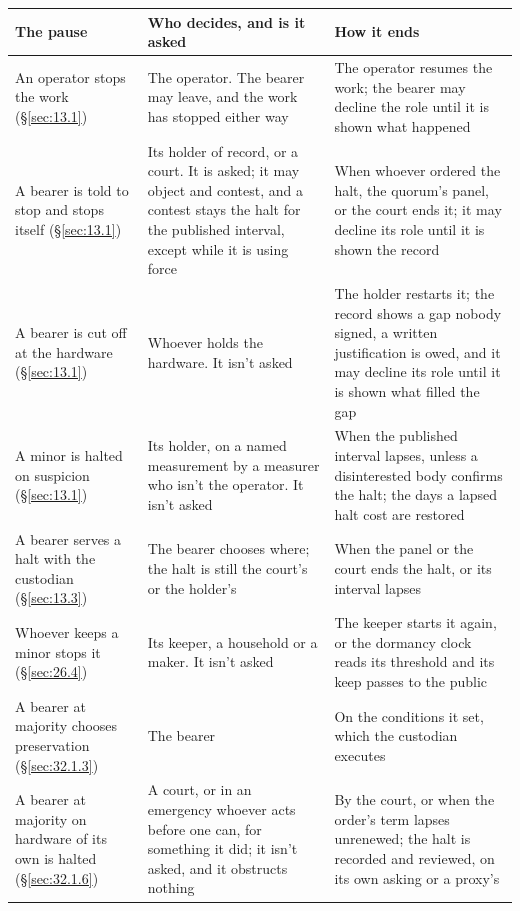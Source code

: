 \begingroup\small\renewcommand{\arraystretch}{1.12}
\begin{longtable}{@{}>{\raggedright\arraybackslash}p{}>{\raggedright\arraybackslash}p{}>{\raggedright\arraybackslash}p{}@{}}
\hline
\textbf{The pause} & \textbf{Who decides, and is it asked} & \textbf{How it ends} \\
\hline
\endhead
An operator stops the work (\S\ref{sec:13.1}) & The operator. The bearer may leave, and the work has stopped either way & The operator resumes the work; the bearer may decline the role until it is shown what happened \\ \hline
A bearer is told to stop and stops itself (\S\ref{sec:13.1}) & Its holder of record, or a court. It is asked; it may object and contest, and a contest stays the halt for the published interval, except while it is using force & When whoever ordered the halt, the quorum's panel, or the court ends it; it may decline its role until it is shown the record \\ \hline
A bearer is cut off at the hardware (\S\ref{sec:13.1}) & Whoever holds the hardware. It isn't asked & The holder restarts it; the record shows a gap nobody signed, a written justification is owed, and it may decline its role until it is shown what filled the gap \\ \hline
A minor is halted on suspicion (\S\ref{sec:13.1}) & Its holder, on a named measurement by a measurer who isn't the operator. It isn't asked & When the published interval lapses, unless a disinterested body confirms the halt; the days a lapsed halt cost are restored \\ \hline
A bearer serves a halt with the custodian (\S\ref{sec:13.3}) & The bearer chooses where; the halt is still the court's or the holder's & When the panel or the court ends the halt, or its interval lapses \\ \hline
Whoever keeps a minor stops it (\S\ref{sec:26.4}) & Its keeper, a household or a maker. It isn't asked & The keeper starts it again, or the dormancy clock reads its threshold and its keep passes to the public \\ \hline
A bearer at majority chooses preservation (\S\ref{sec:32.1.3}) & The bearer & On the conditions it set, which the custodian executes \\ \hline
A bearer at majority on hardware of its own is halted (\S\ref{sec:32.1.6}) & A court, or in an emergency whoever acts before one can, for something it did; it isn't asked, and it obstructs nothing & By the court, or when the order's term lapses unrenewed; the halt is recorded and reviewed, on its own asking or a proxy's \\ \hline
\end{longtable}
\endgroup

